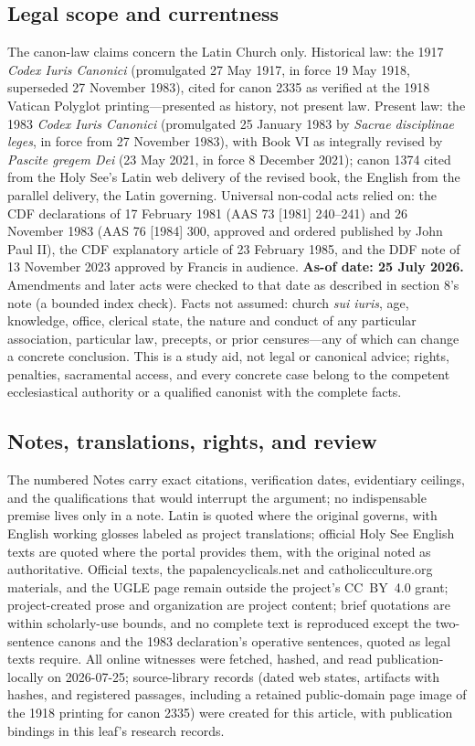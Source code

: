 \subsection{Legal scope and currentness}

The canon-law claims concern the Latin Church only. Historical law: the 1917 \emph{Codex Iuris Canonici} (promulgated 27 May 1917, in force 19 May 1918, superseded 27 November 1983), cited for canon 2335 as verified at the 1918 Vatican Polyglot printing---presented as history, not present law. Present law: the 1983 \emph{Codex Iuris Canonici} (promulgated 25 January 1983 by \emph{Sacrae disciplinae leges}, in force from 27 November 1983), with Book VI as integrally revised by \emph{Pascite gregem Dei} (23 May 2021, in force 8 December 2021); canon 1374 cited from the Holy See's Latin web delivery of the revised book, the English from the parallel delivery, the Latin governing. Universal non-codal acts relied on: the CDF declarations of 17 February 1981 (AAS 73 [1981] 240--241) and 26 November 1983 (AAS 76 [1984] 300, approved and ordered published by John Paul II), the CDF explanatory article of 23 February 1985, and the DDF note of 13 November 2023 approved by Francis in audience. \textbf{As-of date: 25 July 2026.} Amendments and later acts were checked to that date as described in section 8's note (a bounded index check). Facts not assumed: church \emph{sui iuris}, age, knowledge, office, clerical state, the nature and conduct of any particular association, particular law, precepts, or prior censures---any of which can change a concrete conclusion. This is a study aid, not legal or canonical advice; rights, penalties, sacramental access, and every concrete case belong to the competent ecclesiastical authority or a qualified canonist with the complete facts.

\subsection{Notes, translations, rights, and review}

The numbered Notes carry exact citations, verification dates, evidentiary ceilings, and the qualifications that would interrupt the argument; no indispensable premise lives only in a note. Latin is quoted where the original governs, with English working glosses labeled as project translations; official Holy See English texts are quoted where the portal provides them, with the original noted as authoritative. Official texts, the papalencyclicals.net and catholicculture.org materials, and the UGLE page remain outside the project's CC~BY~4.0 grant; project-created prose and organization are project content; brief quotations are within scholarly-use bounds, and no complete text is reproduced except the two-sentence canons and the 1983 declaration's operative sentences, quoted as legal texts require. All online witnesses were fetched, hashed, and read publication-locally on 2026-07-25; source-library records (dated web states, artifacts with hashes, and registered passages, including a retained public-domain page image of the 1918 printing for canon 2335) were created for this article, with publication bindings in this leaf's research records.

